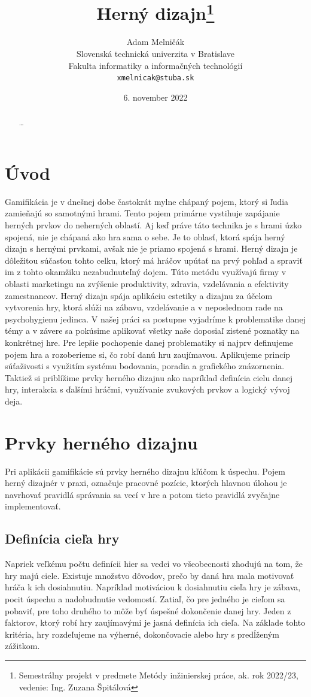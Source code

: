 \documentclass[10pt,twoside,slovak,a4paper]{article}
\title{Herný dizajn\thanks{Semestrálny projekt v predmete Metódy inžinierskej práce, ak. rok 2022/23, vedenie: Ing. Zuzana Špitálová}}
\author{Adam Melničák\\[2pt]
	{\small Slovenská technická univerzita v Bratislave}\\
	{\small Fakulta informatiky a informačných technológií}\\
	{\small \texttt{xmelnicak@stuba.sk}}
	}
\date{\small 6. november 2022}
\begin{document}
\maketitle

\begin{abstract}
\ldots
\end{abstract}



\section{Úvod}
Gamifikácia je v dnešnej dobe častokrát mylne chápaný pojem,  ktorý si ľudia zamieňajú so samotnými hrami.  Tento pojem primárne vystihuje zapájanie herných prvkov do neherných oblastí. Aj keď práve táto technika je s hrami úzko spojená, nie je chápaná ako hra sama o sebe.  Je to oblasť,  ktorá spája herný dizajn s hernými prvkami,  avšak nie je priamo spojená s hrami.  Herný dizajn je dôležitou súčasťou tohto celku,  ktorý má hráčov upútať na prvý pohľad a spraviť im z tohto okamžiku nezabudnuteľný dojem.  Túto metódu využívajú firmy v oblasti marketingu na zvýšenie produktivity, zdravia, vzdelávania a efektivity zamestnancov. Herný dizajn spája aplikáciu estetiky a dizajnu za účelom vytvorenia hry, ktorá slúži na zábavu, vzdelávanie a v neposlednom rade na psychohygienu jedinca.  V našej práci sa postupne vyjadríme k problematike danej témy a v závere sa pokúsime aplikovať všetky naše doposiaľ zistené poznatky na konkrétnej hre.  Pre lepšie pochopenie danej problematiky si najprv definujeme pojem hra a rozoberieme si,  čo robí danú hru zaujímavou. Aplikujeme princíp súťaživosti s využitím systému bodovania,  poradia a grafického znázornenia.  Taktiež si priblížime prvky herného dizajnu ako napríklad definícia cielu danej hry,  interakcia s ďalšími hráčmi,  využívanie zvukových prvkov a logický vývoj deja.  


\section{Prvky herného dizajnu}
Pri aplikácii gamifikácie sú prvky herného dizajnu kľúčom k úspechu\cite{wee2019gamification}. Pojem herný dizajnér v praxi, označuje pracovné pozície, ktorých hlavnou úlohou je navrhovať pravidlá správania sa vecí v hre a potom tieto pravidlá zvyčajne implementovať\cite{zubek2020elements}.

\subsection{Definícia cieľa hry}
Napriek veľkému počtu definícii hier sa vedci vo všeobecnosti zhodujú na tom,  že hry majú ciele\cite{zagal2019ultimate}.   Existuje množstvo dôvodov, prečo by daná hra mala motivovať hráča k ich dosiahnutiu. Napríklad motiváciou k dosiahnutiu cieľa hry je zábava, pocit úspechu a nadobudnutie vedomostí. Zatiaľ, čo pre jedného je cieľom sa pobaviť, pre toho druhého to môže byť úspešné dokončenie danej hry. Jeden z faktorov, ktorý robí hry zaujímavými je jasná definícia ich cieľa.  Na základe tohto kritéria, hry rozdeľujeme na výherné, dokončovacie alebo hry s predĺženým zážitkom.
\end{document}

